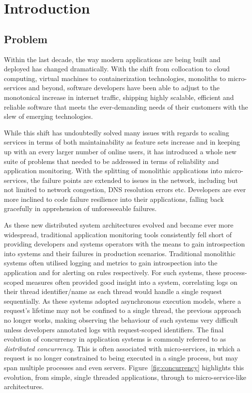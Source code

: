 \documentclass[12pt,pdftex,titlepage]{report}
\begin{document}
    \chapter{Introduction}
    \setcounter{page}{1}
        \section{Problem}
            Within the last decade, the way modern applications are being built and deployed has changed dramatically. With the shift from collocation to cloud computing,
            virtual machines to containerization technologies, monoliths to micro-services and beyond, software developers have been able to adjust to 
            the monotonical increase in internet traffic, shipping highly scalable, efficient and reliable software that meets the ever-demanding needs of their customers
            with the slew of emerging technologies.

            While this shift has undoubtedly solved many issues with regards to scaling services in terms of both maintainability as feature sets increase and in keeping up
            with an every larger number of online users, it has introduced a whole new suite of problems that needed to be addressed in terms of reliability and application 
            monitoring. With the splitting of monolithic applications into micro-services, the failure points are extended to issues in the network, including but not limited
            to network congestion, DNS resolution errors etc. Developers are ever more inclined to code failure resilience into their applications, falling back gracefully in 
            apprehension of unforeseeable failures.

            As these new distributed system architectures evolved and became ever more widespread, traditional application monitoring tools consistently fell short of providing
            developers and systems operators with the means to gain introspection into systems and their failures in production scenarios\cite{retrospective}. Traditional monolithic systems often
            utilised logging and metrics to gain introspection into the application and for alerting on rules respectively. For such systems, these process-scoped measures often 
            provided good insight into a system, correlating logs on their thread identifier/name as each thread would handle a single request sequentially. As these systems 
            adopted asynchronous execution models, where a request's lifetime may not be confined to a single thread, the previous approach no longer works, making observing
            the behaviour of such systems very difficult unless developers annotated logs with request-scoped identifiers. The final evolution of concurrency in application systems is
            commonly referred to as \textit{distributed concurrency}. This is often associated with micro-services, in which a request is no longer constrained to being executed
            in a single process, but may span multiple processes and even servers. Figure~\ref{fig:concurrency} highlights this evolution, from simple, single threaded applications,
            through to micro-service-like architectures.
\end{document}
